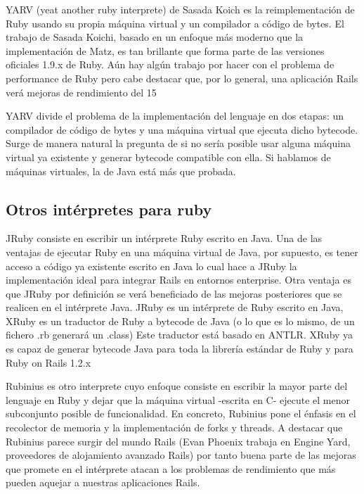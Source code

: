 \documentclass{article}
\begin{document}
YARV (yeat another ruby interprete) de Sasada Koich es  la reimplementación de Ruby usando su propia máquina virtual y un compilador a código de bytes. El trabajo de Sasada Koichi, basado en un enfoque más moderno que la implementación de Matz, es tan brillante que forma parte de las versiones oficiales 1.9.x de Ruby. Aún hay algún trabajo por hacer con el problema de performance de Ruby pero cabe destacar que, por lo general, una aplicación Rails verá mejoras de rendimiento del 15%

YARV divide el problema de la implementación del lenguaje en dos etapas: un compilador de código de bytes y una máquina virtual que ejecuta dicho bytecode. Surge de manera natural la pregunta de si no sería posible usar alguna máquina virtual ya existente y generar bytecode compatible con ella. Si hablamos de máquinas virtuales, la de Java está más que probada.
\bigskip



\subsection{Otros intérpretes para ruby}

JRuby consiste en escribir un intérprete Ruby escrito en Java. Una de las ventajas de ejecutar Ruby en una máquina virtual de Java, por supuesto, es tener acceso a código ya existente escrito en Java lo cual hace a JRuby la implementación ideal para integrar Rails en entornos enterprise. Otra ventaja es que JRuby por definición se verá beneficiado de las mejoras posteriores que se realicen en el intérprete Java. JRuby es un intérprete de Ruby escrito en Java, XRuby es un traductor de Ruby a bytecode de Java (o lo que es lo mismo, de un fichero .rb generará un .class) Este traductor está basado en ANTLR. XRuby ya es capaz de generar bytecode Java para toda la librería estándar de Ruby y para Ruby on Rails 1.2.x

Rubinius es otro interprete cuyo enfoque consiste en escribir la mayor parte del lenguaje en Ruby y dejar que la máquina virtual -escrita en C- ejecute el menor subconjunto posible de funcionalidad. En concreto, Rubinius pone el énfasis en el recolector de memoria y la implementación de forks y threads. A destacar que Rubinius parece surgir del mundo Rails (Evan Phoenix trabaja en Engine Yard, proveedores de alojamiento avanzado Rails) por tanto buena parte de las mejoras que promete en el intérprete atacan a los problemas de rendimiento que más pueden aquejar a nuestras aplicaciones Rails.
\bigskip
\end{document}
